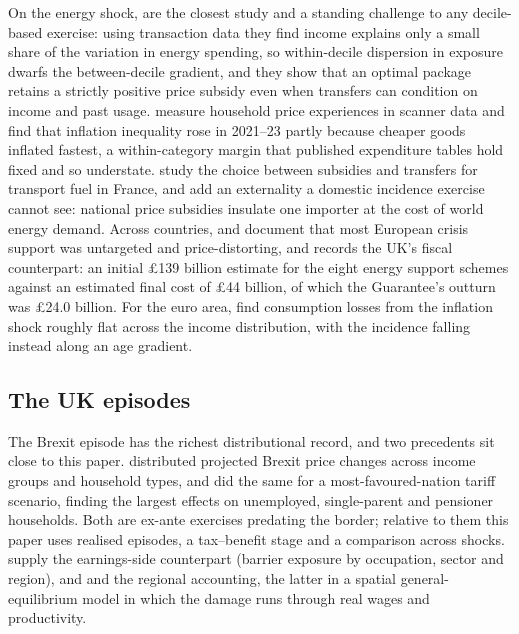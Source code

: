 On the energy shock, \citet{levell2025} are the closest study and a
standing challenge to any decile-based exercise: using transaction
data they find income explains only a small share of the variation in
energy spending, so within-decile dispersion in exposure dwarfs the
between-decile gradient, and they show that an optimal package retains
a strictly positive price subsidy even when transfers can condition on
income and past usage. \citet{chenlevell2024} measure household price
experiences in scanner data and find that inflation inequality rose in
2021--23 partly because cheaper goods inflated fastest, a
within-category margin that published expenditure tables hold fixed
and so understate. \citet{bonnet2025} study the choice between
subsidies and transfers for transport fuel in France, and
\citet{auclert2023} add an externality a domestic incidence exercise
cannot see: national price subsidies insulate one importer at the cost
of world energy demand. Across countries, \citet{ari2022} and
\citet{amaglobeli2026} document that most European crisis support was
untargeted and price-distorting, and \citet{nao2024} records the UK's
fiscal counterpart: an initial \pounds 139 billion estimate for the
eight energy support schemes against an estimated final cost of
\pounds 44 billion, of which the Guarantee's outturn was \pounds 24.0
billion. For the euro area, \citet{pallotti2023} find consumption
losses from the inflation shock roughly flat across the income
distribution, with the incidence falling instead along an age
gradient.

\subsection{The UK episodes}

The Brexit episode has the richest distributional record, and two
precedents sit close to this paper. \citet{breinlich2016} distributed
projected Brexit price changes across income groups and household
types, and \citet{clarke2017} did the same for a most-favoured-nation tariff scenario,
finding the largest effects on unemployed, single-parent and pensioner
households. Both are ex-ante exercises predating the border; relative
to them this paper uses realised episodes, a tax--benefit stage and a comparison across shocks. \citet{davenportlevell2021} supply the
earnings-side counterpart (barrier exposure by occupation, sector and
region), and \citet{alabrese2026} and \citet{dhingra2026} the regional
accounting, the latter in a spatial general-equilibrium model in which
the damage runs through real wages and productivity.

